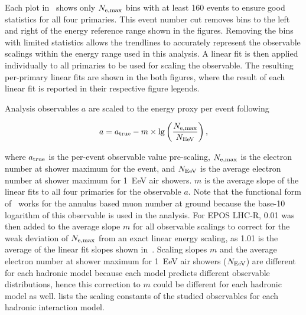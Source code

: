 Each plot in~ shows only $N_{\rm e, max}$ bins with at least 160 events to ensure good statistics for all four primaries.
This event number cut removes bins to the left and right of the energy reference range shown in the figures.
Removing the bins with limited statistics allows the trendlines to accurately represent the observable scalings within the energy range used in this analysis.
A linear fit is then applied individually to all primaries to be used for scaling the observable.
The resulting per-primary linear fits are shown in the both figures, where the result of each linear fit is reported in their respective figure legends.

Analysis observables $a$ are scaled to the energy proxy per event following 

\begin{equation}
  a = a_{\rm true} - m \times \lg \left( \frac{N_{\rm e, max}}{N_{\rm EeV}} \right), \label{eq:scaling}
\end{equation}

\noindent
where $a_{\rm true}$ is the per-event observable value pre-scaling, $N_{\rm e, max}$ is the electron number at shower maximum for the event, and $N_{\rm EeV}$ is the average electron number at shower maximum for \qty{1}{\exa\electronvolt} air showers.
$m$ is the average slope of the linear fits to all four primaries for the observable $a$.
Note that the functional form of~ works for the annulus based muon number at ground because the base-10 logarithm of this observable is used in the analysis.
For EPOS LHC-R, 0.01 was then added to the average slope $m$ for all observable scalings to correct for the weak deviation of $N_{\rm e, max}$ from an exact linear energy scaling, as 1.01 is the average of the linear fit slopes shown in~.
Scaling slopes $m$ and the average electron number at shower maximum for \qty{1}{\exa\electronvolt} air showers ($N_{\rm EeV}$) are different for each hadronic model because each model predicts different observable distributions, hence this correction to $m$ could be different for each hadronic model as well. 
 lists the scaling constants of the studied observables for each hadronic interaction model.

